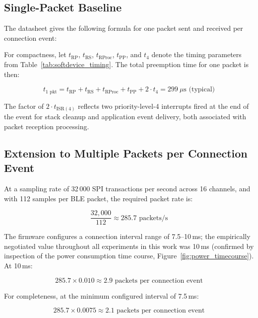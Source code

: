 \subsection*{Single-Packet Baseline}

The datasheet gives the following formula for one packet sent and received 
per connection event:

For compactness, let $t_\text{RP}$, $t_\text{RS}$, $t_\text{RProc}$, 
$t_\text{PP}$, and $t_4$ denote the timing parameters from 
Table~\ref{tab:softdevice_timing}. The total preemption time for one 
packet is then:

\begin{equation}
t_{\text{1 pkt}} = t_\text{RP} + t_\text{RS} + t_\text{RProc} + 
t_\text{PP} + 2 \cdot t_4 = 299~\mu\text{s (typical)}
\label{eq:single_packet}
\end{equation}

The factor of $2 \cdot t_{\text{ISR}(4)}$ reflects two priority-level-4 interrupts 
fired at the end of the event for stack cleanup and application event delivery, 
both associated with packet reception processing.

\subsection*{Extension to Multiple Packets per Connection Event}

At a sampling rate of 32\,000 SPI transactions per second across 16 channels, 
and with 112 samples per BLE packet, the required packet rate is:

\begin{equation}
\frac{32{,}000}{112} \approx 285.7 \text{ packets/s}
\end{equation}

The firmware configures a connection interval range of 7.5--10\,ms; the
empirically negotiated value throughout all experiments in this work was 10\,ms
(confirmed by inspection of the power consumption time course,
Figure~\ref{fig:power_timecourse}). At 10\,ms:

\begin{equation}
285.7 \times 0.010 \approx 2.9 \text{ packets per connection event}
\end{equation}

For completeness, at the minimum configured interval of 7.5\,ms:

\begin{equation}
285.7 \times 0.0075 \approx 2.1 \text{ packets per connection event}
\end{equation}

